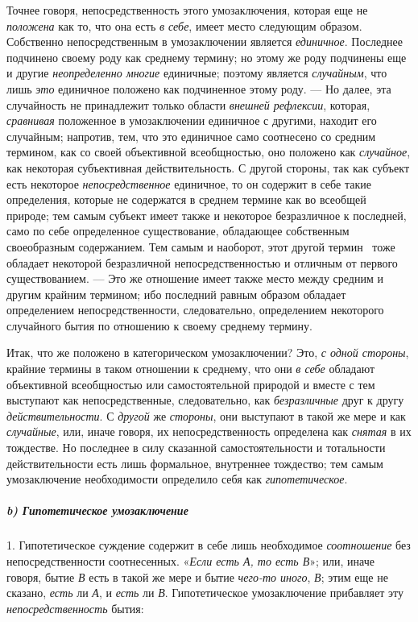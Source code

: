 \documentclass[twoside]{article}
\begin{document}
{{{{{{Точнее говоря, непосредственность этого умозаключения, которая
еще не {\em положена} как
то, что она есть {\em в себе},
имеет место следующим образом. Собственно непосредственным в
умозаключении является {\em единичное}.
Последнее подчинено своему роду как среднему термину; но
этому же роду подчинены еще и другие
{\em неопределенно многие}
единичные; поэтому является
{\em случайным}, что лишь
{\em это} единичное
положено как подчиненное этому роду. — Но далее, эта
случайность не принадлежит только области
{\em внешней рефлексии},
которая, {\em сравнивая}
положенное в умозаключении единичное с другими, находит его
случайным; напротив, тем, что это единичное само соотнесено со средним
термином, как со своей объективной всеобщностью, оно положено как
{\em случайное}, как
некоторая субъективная действительность. С другой стороны, так как субъект
есть некоторое {\em непосредственное}
единичное, то он содержит в себе такие определения, которые
не содержатся в среднем термине как во всеобщей природе; тем самым субъект
имеет также и некоторое безразличное к последней, само по себе определенное
существование, обладающее собственным своеобразным
содержанием. Тем самым и наоборот, этот другой
термин~\label{bkm:bm60}
тоже обладает некоторой безразличной непосредственностью и
отличным от первого существованием. — Это же отношение имеет
также место между средним и другим крайним термином; ибо последний равным
образом обладает определением непосредственности, следовательно,
определением некоторого случайного бытия по отношению к своему среднему
термину.

Итак, что же положено в категорическом умозаключении? Это,
{\em с одной стороны},
крайние термины в таком отношении к среднему, что они
{\em в себе} обладают
объективной всеобщностью или самостоятельной природой и вместе с тем
выступают как непосредственные, следовательно, как
{\em безразличные} друг к
другу {\em действительности}.
С {\em другой}
же {\em стороны},
они выступают в такой же мере и как
{\em случайные}, или,
иначе говоря, их непосредственность определена как
{\em снятая} в их
тождестве. Но последнее в силу сказанной самостоятельности и тотальности
действительности есть лишь формальное, внутреннее тождество; тем самым
умозаключение необходимости определило себя как
{\em гипотетическое}.

\subparagraph[b) Гипотетическое умозаключение]{b) Гипотетическое умозаключение}
1. Гипотетическое суждение содержит в себе лишь необходимое
{\em соотношение} без
непосредственности соотнесенных.
«{\em Если есть А, то есть В}»;
или, иначе говоря, бытие
{\em В} есть в такой же
мере и бытие {\em чего-то иного},
{\em В}; этим еще не
сказано, {\em есть} ли
{\em А}, и
{\em есть} ли
{\em В}. Гипотетическое
умозаключение прибавляет эту
{\em непосредственность}
бытия:

}}}}}}
\end{document}
